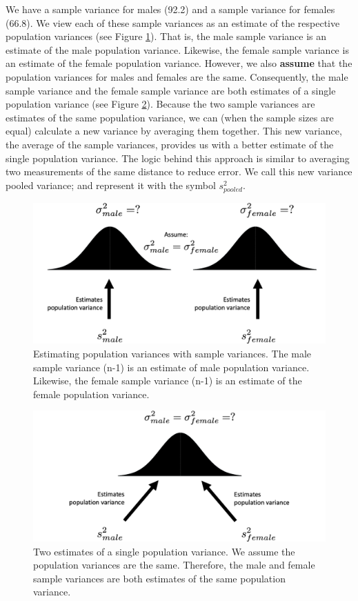 \documentclass[
]{krantz}
\begin{document}
We have a sample variance for males (92.2) and a sample variance for females (66.8). We view each of these sample variances as an estimate of the respective population variances (see Figure \ref{fig:pool1}). That is, the male sample variance is an estimate of the male population variance. Likewise, the female sample variance is an estimate of the female population variance. However, we also \textbf{assume} that the population variances for males and females are the same. Consequently, the male sample variance and the female sample variance are both estimates of a single population variance (see Figure \ref{fig:pool2}). Because the two sample variances are estimates of the same population variance, we can (when the sample sizes are equal) calculate a new variance by averaging them together. This new variance, the average of the sample variances, provides us with a better estimate of the single population variance. The logic behind this approach is similar to averaging two measurements of the same distance to reduce error. We call this new variance pooled variance; and represent it with the symbol \(s_{pooled}^2\).

\newpage

\begin{figure}
\includegraphics[width=0.8\linewidth]{ch_samples/images/pool1} \caption[Estimating population variances with sample variances]{Estimating population variances with sample variances. The male sample variance (n-1) is an estimate of male population variance. Likewise, the female sample variance (n-1) is an estimate of the female population variance. }\label{fig:pool1}
\end{figure}

\vspace{25mm}

\begin{figure}
\includegraphics[width=0.8\linewidth]{ch_samples/images/pool2} \caption[Two estimates of a single population variance]{Two estimates of a single population variance. We assume the population variances are the same. Therefore, the male and female sample variances are both estimates of the same population variance.}\label{fig:pool2}
\end{figure}
\end{document}
